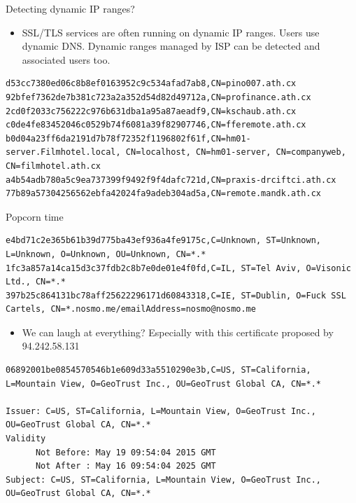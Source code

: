 \begin{frame}[t,fragile]{Detecting dynamic IP ranges?}
        \begin{itemize}
                \item SSL/TLS services are often running on dynamic IP ranges. Users use dynamic DNS. Dynamic ranges managed by ISP can be detected and associated users too.
        \end{itemize}
        \begin{lstlisting}[language=brol]
d53cc7380ed06c8b8ef0163952c9c534afad7ab8,CN=pino007.ath.cx
92bfef7362de7b381c723a2a352d54d82d49712a,CN=profinance.ath.cx
2cd0f2033c756222c976b631dba1a95a87aeadf9,CN=kschaub.ath.cx
c0de4fe83452046c0529b74f6081a39f82907746,CN=fferemote.ath.cx
b0d04a23ff6da2191d7b78f72352f1196802f61f,CN=hm01-server.Filmhotel.local, CN=localhost, CN=hm01-server, CN=companyweb, CN=filmhotel.ath.cx
a4b54adb780a5c9ea737399f9492f9f4dafc721d,CN=praxis-drciftci.ath.cx
77b89a57304256562ebfa42024fa9adeb304ad5a,CN=remote.mandk.ath.cx
        \end{lstlisting}
\end{frame}

\begin{frame}[t,fragile]{Popcorn time}
        \begin{lstlisting}[language=brol]
e4bd71c2e365b61b39d775ba43ef936a4fe9175c,C=Unknown, ST=Unknown, L=Unknown, O=Unknown, OU=Unknown, CN=*.*
1fc3a857a14ca15d3c37fdb2c8b7e0de01e4f0fd,C=IL, ST=Tel Aviv, O=Visonic Ltd., CN=*.*
397b25c864131bc78aff25622296171d60843318,C=IE, ST=Dublin, O=Fuck SSL Cartels, CN=*.nosmo.me/emailAddress=nosmo@nosmo.me
        \end{lstlisting}

\begin{itemize}
\item We can laugh at everything? Especially with this certificate proposed by 94.242.58.131
\end{itemize}
        \begin{lstlisting}[language=brol]
06892001be0854570546b1e609d33a5510290e3b,C=US, ST=California, L=Mountain View, O=GeoTrust Inc., OU=GeoTrust Global CA, CN=*.*

Issuer: C=US, ST=California, L=Mountain View, O=GeoTrust Inc., OU=GeoTrust Global CA, CN=*.*
Validity
      Not Before: May 19 09:54:04 2015 GMT
      Not After : May 16 09:54:04 2025 GMT
Subject: C=US, ST=California, L=Mountain View, O=GeoTrust Inc., OU=GeoTrust Global CA, CN=*.*

        \end{lstlisting}

\end{frame}


